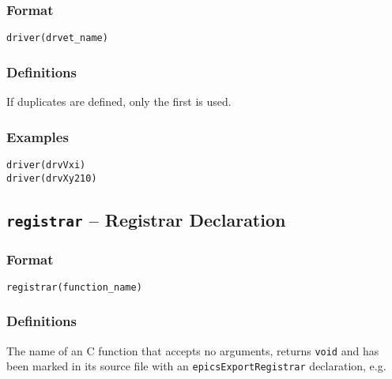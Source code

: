 \subsubsection{Format}

\begin{verbatim}
driver(drvet_name)
\end{verbatim}

\subsubsection{Definitions}

\begin{description}
\item [drvet\_name] If duplicates are defined, only the first is used.

\end{description}

\subsubsection{Examples}

\begin{verbatim}
driver(drvVxi)
driver(drvXy210)
\end{verbatim}

\subsection{\texttt{registrar} -- Registrar Declaration}

\subsubsection{Format}

\begin{verbatim}
registrar(function_name)
\end{verbatim}

\subsubsection{Definitions}

\begin{description}
\item [function\_name] The name of an C function that accepts no arguments, returns \verb|void| and has been marked in
its source file with an \verb|epicsExportRegistrar| declaration, e.g.
\end{description}

